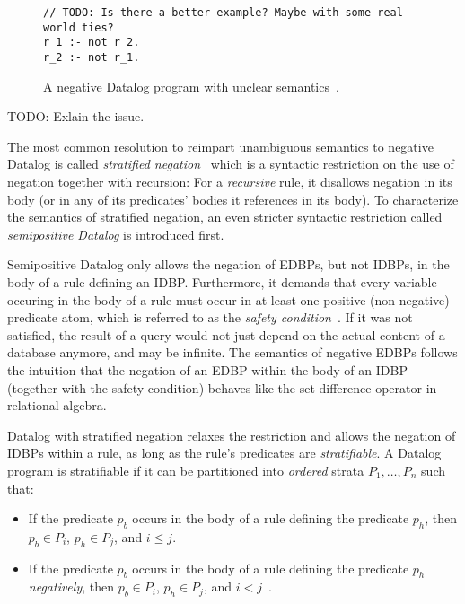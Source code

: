 \begin{figure}[htpb]
	\centering
	\begin{lstlisting}[keepspaces]
// TODO: Is there a better example? Maybe with some real-world ties?
r_1 :- not r_2.
r_2 :- not r_1.\end{lstlisting}
	\caption{A negative Datalog program with unclear semantics~\cite{green2013datalog}.}\label{code:negative-datalog-issue}
\end{figure}

TODO: Exlain the issue.

The most common resolution to reimpart unambiguous semantics to negative Datalog
is called \emph{stratified negation}~\cite{green2013datalog} which is a syntactic
restriction on the use of negation together with recursion:
For a \emph{recursive} rule, it disallows negation in its body
(or in any of its predicates' bodies it references in its body).
To characterize the semantics of stratified negation,
an even stricter syntactic restriction called \emph{semipositive Datalog}
is introduced first.

Semipositive Datalog only allows the negation of \acp{EDBP}, but not \acp{IDBP},
in the body of a rule defining an \ac{IDBP}.
Furthermore, it demands that every variable occuring in the body of a rule must
occur in at least one positive (non-negative) predicate atom,
which is referred to as the \emph{safety condition}~\cite{green2013datalog}.
If it was not satisfied, the result of a query would not just depend on the
actual content of a database anymore, and may be infinite.
The semantics of negative \acp{EDBP} follows the intuition that
the negation of an \ac{EDBP} within the body of an \ac{IDBP} (together with
the safety condition) behaves like the set difference operator
in relational algebra.

Datalog with stratified negation relaxes the restriction and allows the
negation of \acp{IDBP} within a rule, as long as the rule's predicates
are \emph{stratifiable}.
A Datalog program is stratifiable if it can be partitioned into \emph{ordered}
strata \(P_1, \ldots, P_n\) such that:

\begin{itemize}
	\item If the predicate \(p_b\) occurs in the body of a rule defining
	      the predicate \(p_h\), then \(p_b \in P_i\), \(p_h \in P_j\), and
	      \(i \leq j\).
	\item If the predicate \(p_b\) occurs in the body of a rule defining
	      the predicate \(p_h\) \emph{negatively}, then \(p_b \in P_i\),
	      \(p_h \in P_j\), and \(i < j\)~\cite{green2013datalog}.
\end{itemize}

